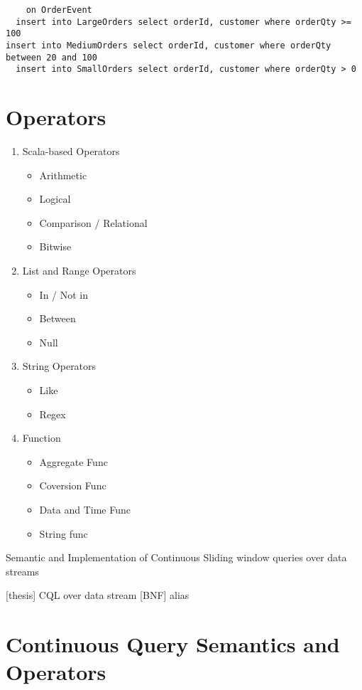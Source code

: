 \begin{verbatim}
	on OrderEvent
  insert into LargeOrders select orderId, customer where orderQty >= 100
insert into MediumOrders select orderId, customer where orderQty between 20 and 100
  insert into SmallOrders select orderId, customer where orderQty > 0
\end{verbatim}


\section{Operators}
\begin{enumerate}

\item Scala-based Operators
	\begin{itemize}
        \item Arithmetic
        \item Logical
        \item Comparison / Relational
        \item Bitwise
	\end{itemize}
	
 \item List and Range Operators
 	\begin{itemize}
        \item In / Not in
        \item Between
        \item Null
 	\end{itemize}
 \item String Operators
 	\begin{itemize}
        \item Like
        \item Regex
 	\end{itemize}
 \item Function 
 	\begin{itemize}
        \item Aggregate Func
        \item Coversion Func
       	\item Data and Time Func
        \item String func
 	\end{itemize}

\end{enumerate}
Semantic and Implementation of Continuous Sliding window queries over data streams

[thesis] CQL over data stream [BNF] alias


\section{Continuous Query Semantics and Operators}

